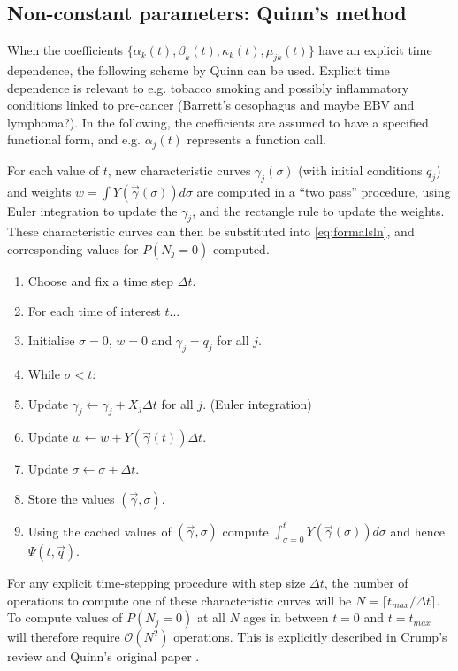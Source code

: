 \documentclass{article}
\begin{document}
\subsection*{Non-constant parameters: Quinn's method}
When the coefficients $\{\alpha_k(t), \beta_k(t), \kappa_k(t), \mu_{jk}(t)\}$
have an explicit time dependence, the following scheme by Quinn can be used\cite{quinn1989calculating}. Explicit time dependence is relevant to e.g. tobacco smoking
and possibly inflammatory conditions linked to pre-cancer (Barrett's oesophagus and maybe
EBV and lymphoma?). In the following, the coefficients are assumed to have a
specified functional form, and e.g. $\alpha_j(t)$ represents a function call.

For each value of $t$, new characteristic curves $\gamma_j(\sigma)$ (with initial
conditions $q_j$) and weights
$w = \int Y(\vec{\gamma}(\sigma)) d\sigma$ are computed in a ``two pass'' procedure, using Euler
integration to update the $\gamma_j$, and the rectangle rule to update the
weights. These
characteristic curves can then be substituted into \eqref{eq:formalsln}, and
corresponding values for $P(N_j = 0)$ computed.

\begin{enumerate}
    \item Choose and fix a time step $\Delta t$.
    \item For each time of interest $t$...
    \item Initialise $\sigma = 0$, $w = 0$ and $\gamma_j = q_j$ for all $j$.
    \item While $\sigma < t$:
    \item Update $\gamma_j \leftarrow \gamma_j + X_j \Delta t$ for all $j$.
    (Euler integration)
    \item Update $w \leftarrow w + Y(\vec{\gamma}(t)) \Delta t$.
    \item Update $\sigma \leftarrow \sigma + \Delta t$.
    \item Store the values $(\vec{\gamma}, \sigma)$.
    \item Using the cached values of $(\vec{\gamma}, \sigma)$ compute $\int_{\sigma=0}^t
    Y(\vec{\gamma}(\sigma)) d\sigma$ and hence $\Psi(t, \vec{q})$.
\end{enumerate}

For any explicit time-stepping procedure with step size $\Delta t$, the number
of operations to compute one of these characteristic curves will be $N = \lceil
t_{max} / \Delta t \rceil$. To compute values of $P(N_j = 0)$ at all $N$ ages
in between $t=0$ and $t=t_{max}$ will therefore require $\mathcal{O}(N^2)$
operations. This is explicitly described in Crump's review and Quinn's original
paper \cite{crump2005numerical,quinn1989calculating}.
\end{document}
